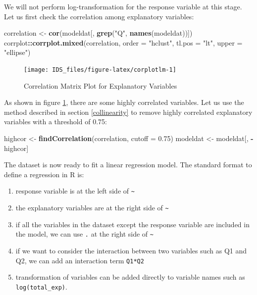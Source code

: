 \documentclass[12pt,]{krantz}
\makeatletter
\newenvironment{Shaded}{\begin{snugshade}}{\end{snugshade}}
\newcommand{\DataTypeTok}[1]{\textcolor[rgb]{0.27,0.27,0.27}{#1}}
\newcommand{\FloatTok}[1]{\textcolor[rgb]{0.06,0.06,0.06}{#1}}
\newcommand{\KeywordTok}[1]{\textcolor[rgb]{0.27,0.27,0.27}{\textbf{#1}}}
\newcommand{\NormalTok}[1]{#1}
\newcommand{\OperatorTok}[1]{\textcolor[rgb]{0.43,0.43,0.43}{\textbf{#1}}}
\newcommand{\StringTok}[1]{\textcolor[rgb]{0.5,0.5,0.5}{#1}}
\newenvironment{kframe}{%
\medskip{}
\setlength{\fboxsep}{.8em}
 \def\at@end@of@kframe{}%
 \ifinner\ifhmode%
  \def\at@end@of@kframe{\end{minipage}}%
  \begin{minipage}{\columnwidth}%
 \fi\fi%
 \def\FrameCommand##1{\hskip\@totalleftmargin \hskip-\fboxsep
 \colorbox{shadecolor}{##1}\hskip-\fboxsep
     \hskip-\linewidth \hskip-\@totalleftmargin \hskip\columnwidth}%
 \MakeFramed {\advance\hsize-\width
   \@totalleftmargin\z@ \linewidth\hsize
   \@setminipage}}%
 {\par\unskip\endMakeFramed%
 \at@end@of@kframe}
\renewenvironment{Shaded}{\begin{kframe}}{\end{kframe}}
\makeatother
\begin{document}
We will not perform log-transformation for the response variable at this stage. Let us first check the correlation among explanatory variables:

\begin{Shaded}
\begin{Highlighting}[]
\NormalTok{correlation <-}\StringTok{ }\KeywordTok{cor}\NormalTok{(modeldat[, }\KeywordTok{grep}\NormalTok{(}\StringTok{"Q"}\NormalTok{, }\KeywordTok{names}\NormalTok{(modeldat))])}
\NormalTok{corrplot}\OperatorTok{::}\KeywordTok{corrplot.mixed}\NormalTok{(correlation, }\DataTypeTok{order =} \StringTok{"hclust"}\NormalTok{, }\DataTypeTok{tl.pos =} \StringTok{"lt"}\NormalTok{, }
    \DataTypeTok{upper =} \StringTok{"ellipse"}\NormalTok{)}
\end{Highlighting}
\end{Shaded}

\begin{figure}

{\centering \texttt{[image: IDS\_files/figure-latex/corplotlm-1]} 

}

\caption{Correlation Matrix Plot for Explanatory Variables}\label{fig:corplotlm}
\end{figure}

As shown in figure \ref{fig:corplotlm}, there are some highly correlated variables. Let us use the method described in section \ref{collinearity} to remove highly correlated explanatory variables with a threshold of 0.75:

\begin{Shaded}
\begin{Highlighting}[]
\NormalTok{highcor <-}\StringTok{ }\KeywordTok{findCorrelation}\NormalTok{(correlation, }\DataTypeTok{cutoff =} \FloatTok{0.75}\NormalTok{)}
\NormalTok{modeldat <-}\StringTok{ }\NormalTok{modeldat[, }\OperatorTok{-}\NormalTok{highcor]}
\end{Highlighting}
\end{Shaded}

The dataset is now ready to fit a linear regression model. The standard format to define a regression in R is:

\begin{enumerate}
\def\labelenumi{(\arabic{enumi})}
\item
  response variable is at the left side of \texttt{\textasciitilde{}}
\item
  the explanatory variables are at the right side of \texttt{\textasciitilde{}}
\item
  if all the variables in the dataset except the response variable are included in the model, we can use \texttt{.} at the right side of \texttt{\textasciitilde{}}
\item
  if we want to consider the interaction between two variables such as Q1 and Q2, we can add an interaction term \texttt{Q1*Q2}
\item
  transformation of variables can be added directly to variable names such as \texttt{log(total\_exp)}.
\end{enumerate}
\end{document}

